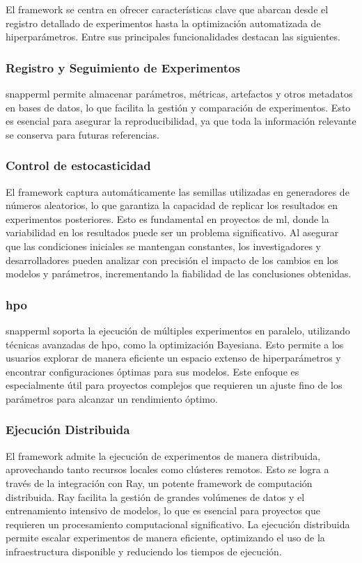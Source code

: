 El \gls{framework} se centra en ofrecer características clave que abarcan desde el registro detallado de experimentos hasta la optimización automatizada de hiperparámetros. Entre sus principales funcionalidades destacan las siguientes.

\subsubsection{Registro y Seguimiento de Experimentos}
\Gls{snapperml} permite almacenar parámetros, métricas, \gls{artefactos} y otros metadatos en bases de datos, lo que facilita la gestión y comparación de experimentos. Esto es esencial para asegurar la reproducibilidad, ya que toda la información relevante se conserva para futuras referencias.

\subsubsection{Control de \Gls{estocasticidad}}
El \gls{framework} captura automáticamente las semillas utilizadas en generadores de números aleatorios, lo que garantiza la capacidad de replicar los resultados en experimentos posteriores. Esto es fundamental en proyectos de \acrlong{ml}, donde la variabilidad en los resultados puede ser un problema significativo. Al asegurar que las condiciones iniciales se mantengan constantes, los investigadores y desarrolladores pueden analizar con precisión el impacto de los cambios en los modelos y parámetros, incrementando la fiabilidad de las conclusiones obtenidas.

\subsubsection{\acrlong{hpo}}
\Gls{snapperml} soporta la ejecución de múltiples experimentos en paralelo, utilizando técnicas avanzadas de \acrshort{hpo}, como la optimización Bayesiana. Esto permite a los usuarios explorar de manera eficiente un espacio extenso de hiperparámetros y encontrar configuraciones óptimas para sus modelos. Este enfoque es especialmente útil para proyectos complejos que requieren un ajuste fino de los parámetros para alcanzar un rendimiento óptimo.

\subsubsection{Ejecución Distribuida}
El \gls{framework} admite la ejecución de experimentos de manera distribuida, aprovechando tanto recursos locales como clústeres remotos. Esto se logra a través de la integración con Ray, un potente \gls{framework} de computación distribuida. Ray facilita la gestión de grandes volúmenes de datos y el entrenamiento intensivo de modelos, lo que es esencial para proyectos que requieren un procesamiento computacional significativo. La ejecución distribuida permite escalar experimentos de manera eficiente, optimizando el uso de la infraestructura disponible y reduciendo los tiempos de ejecución.

